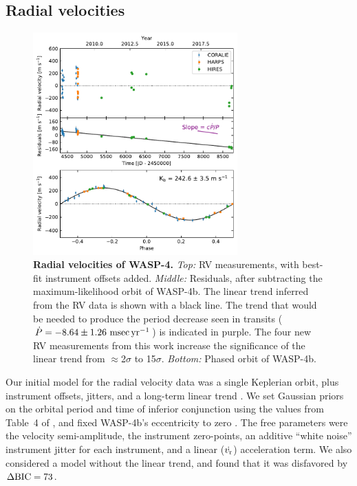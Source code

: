 \documentclass[12pt,twocolumn,tighten]{aastex62}
\begin{document}
\subsection{Radial velocities}

\begin{figure}[t]
	\begin{center}
		\leavevmode
		\includegraphics[width=0.7\textwidth]{f2.pdf}
	\end{center}
	\vspace{-0.7cm}
	\caption{
    {\bf Radial velocities of WASP-4.}
    {\it Top:} RV measurements, with best-fit instrument offsets
    added. 
    {\it Middle:}
    Residuals, after subtracting the
    maximum-likelihood orbit of WASP-4b.  The linear trend
    inferred from the RV data is shown with a black line.
    The trend that would be needed to
    produce the period decrease seen in transits ($\dot{P}= - 8.64 \pm
    1.26~{\rm msec}\,{\rm yr}^{-1}$) is indicated in purple.  The four
    new RV measurements from this work increase the
    significance of the linear trend from $\approx$2$\sigma$
    to 15$\sigma$.
    {\it Bottom:}
    Phased orbit of WASP-4b.
	\label{fig:rvs}
  \vspace{-0.0cm}
	}
\end{figure}

Our initial model for the radial velocity data was a single Keplerian
orbit, plus instrument offsets, jitters, and a long-term linear trend
\citep[][\texttt{radvel}]{fulton_radvel_2018}.  We set Gaussian priors
on the orbital period and time of inferior conjunction using the
values from Table~4 of , and fixed
WASP-4b's eccentricity to zero
\citep{beerer_secondary_2011,knutson_friends_2014,bonomo_gaps_2017}.
The free parameters were the velocity semi-amplitude, the instrument
zero-points, an additive ``white noise'' instrument jitter for each
instrument, and a linear ($\dot{v_{\rm r}}$) acceleration term.  We
also considered a model without the linear trend, and found that it
was disfavored by $\Delta {\rm BIC}=73$.
\end{document}
